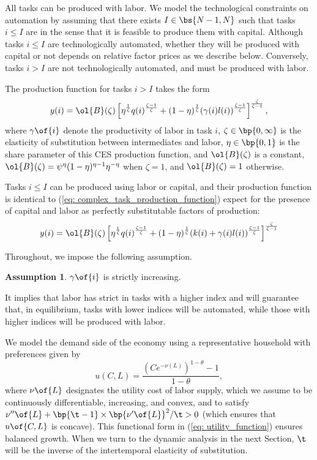 \documentclass[12pt]{article}
\newcommand{\highlightB}[1]{{\emph{\color{MyBlue}{#1}}}}
\theoremstyle{definition}
\newtheorem{assumption}{Assumption}
\begin{document}
All tasks can be produced with labor. We model the technological constraints on automation by assuming that there exists $I \in \bs{N-1, N}$ such that tasks $i \leq I$ are \highlightB{technologically automated} in the sense that it is feasible to produce them with capital. Although tasks $i \leq I$ are technologically automated, whether they will be produced with capital or not depends on relative factor prices as we describe below. Conversely, tasks $i>I$ are not technologically automated, and must be produced with labor.

The production function for tasks $i > I$ takes the form
\begin{equation} 
    \label{eq: complex_task_production_function}
	y(i) = \ol{B}(\zeta)\left[\eta^{\frac{1}{\zeta}} q(i)^{\frac{\zeta-1}{\zeta}}+(1-\eta)^{\frac{1}{\zeta}}(\gamma(i) l(i))^{\frac{\zeta-1}{\zeta}}\right]^{\frac{\zeta}{\zeta-1}},
\end{equation}
where $\gamma\of{i}$ denote the productivity of labor in task $i$, $\zeta \in \bp{0, \infty}$ is the elasticity of substitution between intermediates and labor, $\eta \in \bp{0,1}$ is the share parameter of this CES production function, and $\ol{B}(\zeta)$ is a constant, $\ol{B}(\zeta) = \psi^\eta(1-\eta)^{\eta-1} \eta^{-\eta}$ when $\zeta=1$, and $\ol{B}(\zeta)=1$ otherwise.

Tasks $i \leq I$ can be produced using labor or capital, and their production function is identical to (\ref{eq: complex_task_production_function}) expect for the presence of capital and labor as perfectly substitutable factors of production:
\begin{equation}
    \label{eq: simple_task_production_function}
	y(i) = \ol{B}(\zeta)\left[\eta^\frac{1}{\zeta} q(i)^{\frac{\zeta-1}{\zeta}}+(1-\eta)^\frac{1}{\zeta}(k(i)+\gamma(i) l(i))^{\frac{\zeta-1}{\zeta}}\right]^{\frac{\zeta}{\zeta-1}}
\end{equation}

Throughout, we impose the following assumption.
\begin{assumption}
    \label{assumption_1}
	$\gamma\of{i}$ is strictly increasing.
\end{assumption}
It implies that labor has strict \highlightB{comparative advantage} in tasks with a higher index and will guarantee that, in equilibrium, tasks with lower indices will be automated, while those with higher indices will be produced with labor.

We model the demand side of the economy using a representative household with preferences given by
\begin{equation}
    \label{eq: utility_function}
	u(C, L) = \frac{\left(C e^{-\nu(L)}\right)^{1-\theta}-1}{1-\theta},
\end{equation}
where $\nu\of{L}$ designates the utility cost of labor supply, which we assume to be continuously differentiable, increasing, and convex, and to satisfy $\nu^{\prime\prime}\of{L} + \bp{\t-1}\times\bp{\nu^{\prime}\of{L}}^2 / \t > 0$ (which ensures that $u\of{C, L}$ is concave). This functional form in (\ref{eq: utility_function}) ensures balanced growth. When we turn to the dynamic analysis in the next Section, $\t$ will be the inverse of the intertemporal elasticity of substitution.
\end{document}
